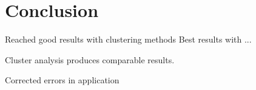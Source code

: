 \chapter{Conclusion}
Reached good results with clustering methods 
Best results with ...

Cluster analysis produces comparable results.

Corrected errors in application